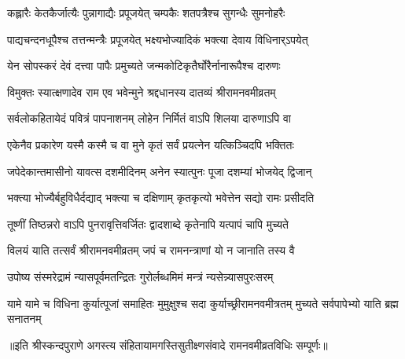 \twolineshloka
{कह्लारैः केतकैर्जात्यैः पुन्नागाद्यैः प्रपूजयेत्}
{चम्पकैः शतपत्रैश्च सुगन्धैः सुमनोहरैः}%

\twolineshloka
{पाद्यचन्दनधूपैश्च तत्तन्मन्त्रैः प्रपूजयेत्}
{भक्ष्यभोज्यादिकं भक्त्या देवाय विधिनार्ऽपयेत्}%

\twolineshloka
{येन सोपस्करं देवं दत्त्वा पापैः प्रमुच्यते}
{जन्मकोटिकृतैर्घोरैर्नानारूपैश्च दारुणः}%

\twolineshloka
{विमुक्तः स्यात्क्षणादेव राम एव भवेन्मुने}
{श्रद्दधानस्य दातव्यं श्रीरामनवमीव्रतम्}%

\twolineshloka
{सर्वलोकहितायेदं पवित्रं पापनाशनम्}
{लोहेन निर्मितं वाऽपि शिलया दारुणाऽपि वा}%

\twolineshloka
{एकेनैव प्रकारेण यस्मै कस्मै च वा मुने}
{कृतं सर्वं प्रयत्नेन यत्किञ्चिदपि भक्तितः}%

\twolineshloka
{जपेदेकान्तमासीनो यावत्स दशमीदिनम्}
{अनेन स्यात्पुनः पूजा दशम्यां भोजयेद् द्विजान्}%

\twolineshloka
{भक्त्या भोज्यैर्बहुविधैर्दद्याद् भक्त्या च दक्षिणाम्}
{कृतकृत्यो भवेत्तेन सद्यो रामः प्रसीदति}%

\twolineshloka
{तूष्णीं तिष्ठन्नरो वाऽपि पुनरावृत्तिवर्जितः}
{द्वादशाब्दे कृतेनापि यत्पापं चापि मुच्यते}%
 
\twolineshloka
{विलयं याति तत्सर्वं श्रीरामनवमीव्रतम्}
{जपं च रामनन्त्राणां यो न जानाति तस्य वै}%

\twolineshloka
{उपोष्य संस्मरेद्रामं न्यासपूर्वमतन्द्रितः}
{गुरोर्लब्धमिमं मन्त्रं न्यसेन्न्यासपुरःसरम्}%

\threelineshloka
{यामे यामे च विधिना कुर्यात्पूजां समाहितः}
{मुमुक्षुश्च सदा कुर्याच्छ्रीरामनवमीत्रतम्}
{मुच्यते सर्वपापेभ्यो याति ब्रह्म सनातनम्}%

॥इति श्रीस्कन्दपुराणे अगस्त्य संहितायामगस्तिसुतीक्ष्णसंवादे रामनवमी\-व्रत\-विधिः सम्पूर्णः॥
